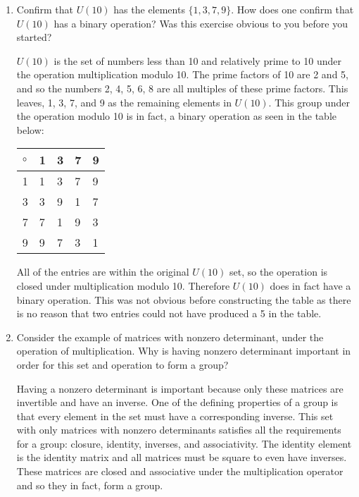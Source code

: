 \documentclass{article}
\begin{document}
\begin{enumerate}
\item  Confirm that $U(10)$ has the elements $\{1,3,7,9\}$. How does one confirm that $U(10)$ has a binary operation? Was this exercise obvious to you before you started?

\begin{flushleft}
$U(10)$ is the set of numbers less than 10 and
relatively prime to 10 under the operation multiplication modulo 10. The prime factors of 10 are 2 and 5, and so the numbers 2, 4, 5, 6, 8 are all multiples of these prime factors. This leaves, 1, 3, 7, and 9 as the remaining elements in $U(10)$. This group under the operation modulo 10 is in fact, a binary operation as seen in the table below:
\end{flushleft}


\begin{table}[ht]
\centering
\begin{tabular}{|l|l|l|l|l|}
\hline
$\circ$ & 1 & 3 & 7 & 9 \\ \hline
1 & 1 & 3 & 7 & 9 \\ \hline
3 & 3 & 9 & 1 & 7 \\ \hline
7 & 7 & 1 & 9 & 3 \\ \hline
9 & 9 & 7 & 3 & 1 \\ \hline
\end{tabular}
\end{table}

\begin{flushleft}
All of the entries are within the original $U(10)$ set, so the operation is closed under multiplication modulo 10. Therefore $U(10)$ does in fact have a binary operation. This was not obvious before constructing the table as there is no reason that two entries could not have produced a 5 in the table.
\end{flushleft}

\item Consider the example of matrices with nonzero determinant, under the operation of multiplication. Why is having nonzero determinant important in order for this set and operation to form a group?

\begin{flushleft}
Having a nonzero determinant is important because only these matrices are invertible and have an inverse. One of the defining properties of a group is that every element in the set must have a corresponding inverse. This set with only matrices with nonzero determinants satisfies all the requirements for a group: closure, identity, inverses, and associativity. The identity element is the identity matrix and all matrices must be square to even have inverses. These matrices are closed and associative under the multiplication operator and so they in fact, form a group.
\end{flushleft}


\end{enumerate}
\end{document}
